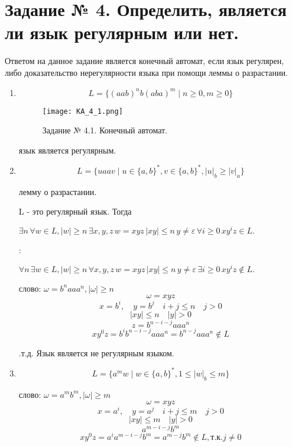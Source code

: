 \documentclass[a4paper, 12pt]{article}
\begin{document}
\section{Задание № 4. Определить, является ли язык регулярным или нет.}

Ответом на данное задание является конечный автомат, если язык регулярен, либо доказательство нерегулярности языка при помощи леммы о разрастании.

\begin{enumerate}

\item$$ L = \{(aab)^nb(aba)^m \mid n \geq 0, m \geq 0 \} $$

\begin{figure}[h!]
\centering
\texttt{[image: KA\_4\_1.png]}
\caption{Задание № 4.1. Конечный автомат.}
\end{figure}

 язык является регулярным.

\item$$L = \{ uaav \mid u \in \{a, b\}^*, v \in \{a, b\}^*, |u|_b \geq |v|_a \}$$

 лемму о разрастании.

 L - это регулярный язык. Тогда 

$ \exists n \, \forall w \in L, |w| \geq n \,\exists x, y, z \, w=xyz \, |xy| \leq n \,  y \neq \varepsilon \, \forall i \geq 0 \, xy^iz \in L. $ 

:

\noindent$ \forall n \, \exists w \in L, |w| \geq n \, \forall x, y, z \, w=xyz \, |xy| \leq n \,  y \neq \varepsilon \, \exists i \geq 0 \, xy^iz \notin L. $

 слово: $ \omega = b^naaa^n, |\omega| \geq n $
$$ \omega = xyz $$
$$ x = b^i, \quad y=b^j \quad i + j \leq n \quad j > 0 $$
$$ |xy| \leq n \quad |y| > 0 $$
$$ z = b^{n-i-j}aaa^n $$
$$ xy^0z = b^ib^{n-i-j}aaa^n = b^{n-j}aaa^n\notin L $$

.т.д. Язык является не регулярным языком.

\item$$L = \{ a^mw \mid w \in \{a, b\}^*, 1 \leq |w|_b \leq m \}$$

 слово: $ \omega = a^mb^m, |\omega| \geq m $
$$ \omega = xyz $$
$$ x = a^i, \quad y=a^j \quad i + j \leq m \quad j > 0 $$
$$ |xy| \leq m \quad |y| > 0 $$
$$ a^{m-i-j}b^m $$
$$ xy^0z = a^ia^{m-i-j}b^m = a^{m-j}b^m \notin L, \text{т.к.} j \neq 0$$


\end{enumerate}
\end{document}
